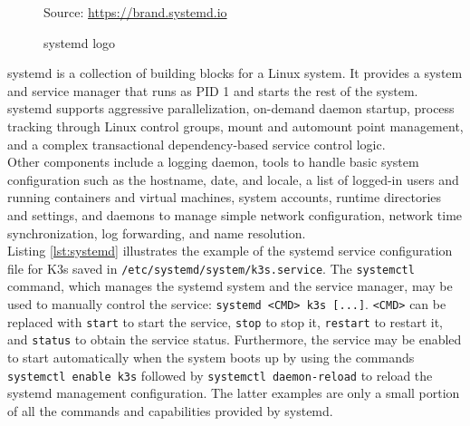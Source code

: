 \begin{figure} %
  \centering
  \def\stackalignment{r} %
  {\scriptsize \parbox[t]{\linewidth}{ Source: \url{https://brand.systemd.io}} }
  \caption{systemd logo}
\end{figure}

systemd is a collection of building blocks for a Linux system. It provides a system
and service manager that runs as PID 1 and starts the rest of the system. \\ %
systemd supports aggressive parallelization, on-demand daemon startup, process tracking
through Linux control groups, mount and automount point management, and a complex
transactional dependency-based service control logic. \\ %
Other components include a logging daemon, tools to handle basic system
configuration such as the hostname, date, and locale, a list of logged-in users and
running containers and virtual machines, system accounts, runtime directories and
settings, and daemons to manage simple network configuration, network time synchronization,
log forwarding, and name resolution\cite{systemd}. \\ %
Listing \ref{lst:systemd} illustrates the example of the systemd service
configuration file for K3s saved in \texttt{/etc/systemd/system/k3s.service}. The
\texttt{systemctl} command, which manages the systemd system and the service manager,
may be used to manually control the service: \texttt{systemd <CMD> k3s [...]}. \texttt{<CMD>}
can be replaced with \texttt{start} to start the service, \texttt{stop} to stop it,
\texttt{restart} to restart it, and \texttt{status} to obtain the service status.
Furthermore, the service may be enabled to start automatically when the system boots
up by using the commands \texttt{systemctl enable k3s} followed by \texttt{systemctl
daemon-reload} to reload the systemd management configuration. The latter
examples are only a small portion of all the commands and capabilities provided
by systemd.

